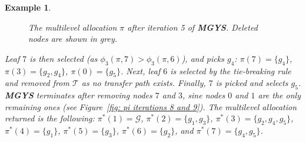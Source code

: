 \documentclass[]{article}
\newtheorem{example}{Example}
\newcommand{\tree}{\mathcal{T}}
\newcommand{\items}{\mathcal{G}}
\begin{document}
\begin{example}
\begin{figure}[H]
    \caption{The multilevel allocation  $\pi$ after iteration 5 of {\bf MGYS}. Deleted nodes are shown in grey.}
    \label{fig: pi iterations 4 and 5}
\end{figure}

Leaf $7$ is then selected (as $\phi_3(\pi,7) >  \phi_3(\pi,6)$), and picks $g_4$: $\pi(7) = \{g_4\}$, $\pi(3) = \{g_2, g_4\}$, $\pi(0) = \{g_5\}$. Next, leaf $6$ is selected by the tie-breaking rule and removed from $\tree$ as no transfer path exists. Finally, $7$ is picked and selects $g_5$. {\bf MGYS} terminates after removing nodes $7$ and $3$, sine nodes $0$ and $1$ are the only remaining ones (see Figure~\ref{fig: pi iterations 8 and 9}). The multilevel allocation returned is the following: $\pi^*(1) = \items$, $\pi^*(2)=\{g_1, g_3\}$,  $\pi^*(3)=\{g_2, g_4, g_5\}$, $\pi^*(4)=\{g_1\}$, $\pi^*(5)=\{g_3\}$, $\pi^*(6)=\{g_2\}$, and $\pi^*(7)= \{g_4, g_5\}$.

        

\end{example}
\end{document}

